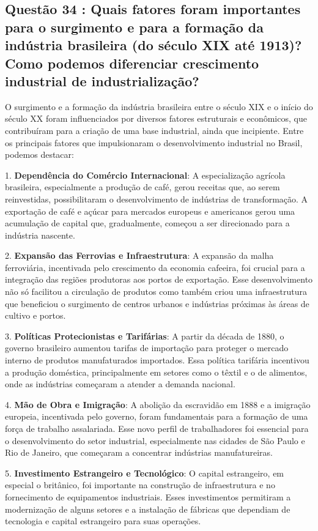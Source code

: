 \documentclass[a4paper,12pt]{article}[abntex2]
\begin{document}
\subsection{\textbf{Questão 34 : Quais fatores foram importantes para o surgimento e para a formação da indústria brasileira (do século XIX até 1913)? Como podemos diferenciar crescimento industrial de industrialização?}}

O surgimento e a formação da indústria brasileira entre o século XIX e o início do século XX foram influenciados por diversos fatores estruturais e econômicos, que contribuíram para a criação de uma base industrial, ainda que incipiente. Entre os principais fatores que impulsionaram o desenvolvimento industrial no Brasil, podemos destacar:

1. \textbf{Dependência do Comércio Internacional}: A especialização agrícola brasileira, especialmente a produção de café, gerou receitas que, ao serem reinvestidas, possibilitaram o desenvolvimento de indústrias de transformação. A exportação de café e açúcar para mercados europeus e americanos gerou uma acumulação de capital que, gradualmente, começou a ser direcionado para a indústria nascente.

2. \textbf{Expansão das Ferrovias e Infraestrutura}: A expansão da malha ferroviária, incentivada pelo crescimento da economia cafeeira, foi crucial para a integração das regiões produtoras aos portos de exportação. Esse desenvolvimento não só facilitou a circulação de produtos como também criou uma infraestrutura que beneficiou o surgimento de centros urbanos e indústrias próximas às áreas de cultivo e portos.

3. \textbf{Políticas Protecionistas e Tarifárias}: A partir da década de 1880, o governo brasileiro aumentou tarifas de importação para proteger o mercado interno de produtos manufaturados importados. Essa política tarifária incentivou a produção doméstica, principalmente em setores como o têxtil e o de alimentos, onde as indústrias começaram a atender a demanda nacional.

4. \textbf{Mão de Obra e Imigração}: A abolição da escravidão em 1888 e a imigração europeia, incentivada pelo governo, foram fundamentais para a formação de uma força de trabalho assalariada. Esse novo perfil de trabalhadores foi essencial para o desenvolvimento do setor industrial, especialmente nas cidades de São Paulo e Rio de Janeiro, que começaram a concentrar indústrias manufatureiras.

5. \textbf{Investimento Estrangeiro e Tecnológico}: O capital estrangeiro, em especial o britânico, foi importante na construção de infraestrutura e no fornecimento de equipamentos industriais. Esses investimentos permitiram a modernização de alguns setores e a instalação de fábricas que dependiam de tecnologia e capital estrangeiro para suas operações.
\end{document}
